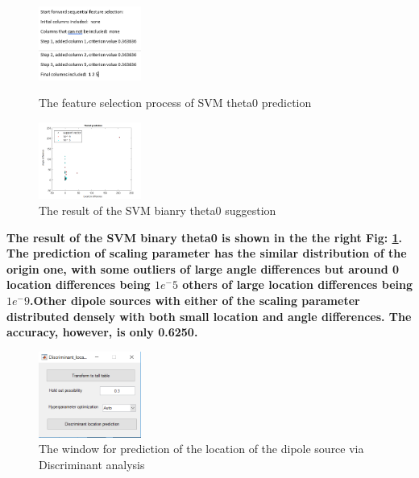 \documentclass[5p]{elsarticle}
\begin{document}
\begin{frontmatter}
\begin{figure}[h!]
  \begin{minipage}
    \begin{center}
    \includegraphics[width=0.3\textwidth]{SVM_M_Theta0_Fs.PNG}
    \end{center}
    \caption{The feature selection process of SVM theta0 prediction}
  \end{minipage}
  \begin{minipage}
    \begin{center}
    \includegraphics[width=0.3\textwidth]{SVM_m_theta0_pred.PNG}
   \end{center}
   \caption{The result of the SVM bianry theta0 suggestion}
  \end{minipage}
  \label{fig_17}
\end{figure}

\bf The result of the SVM binary theta0 is shown in the the right Fig: \ref{fig_17}. The prediction of scaling parameter has the similar distribution of the origin one, with some outliers of large angle differences but around 0 location differences being $1e^-5$ others of large location differences being $1e^-9$.Other dipole sources with either of the scaling parameter distributed densely with both small location and angle differences. The accuracy, however, is only 0.6250. 


\begin{figure}[h!]
    \begin{center}
    \includegraphics[width=0.3\textwidth]{Discriminant_location_prediction.PNG}
  \end{center}
  \caption{The window for prediction of the location of the dipole source via Discriminant analysis}
  \label{fig_18}
\end{figure}


\end{frontmatter}
\end{document}
